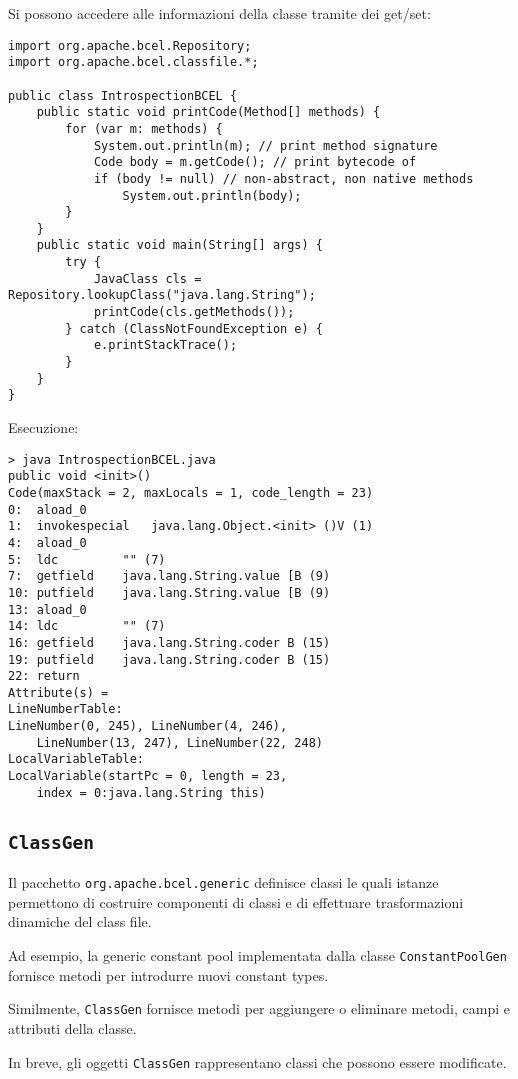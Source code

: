 Si possono accedere alle informazioni della classe tramite dei get/set:
\begin{verbatim}
import org.apache.bcel.Repository;
import org.apache.bcel.classfile.*;

public class IntrospectionBCEL {
    public static void printCode(Method[] methods) {
        for (var m: methods) {
            System.out.println(m); // print method signature
            Code body = m.getCode(); // print bytecode of
            if (body != null) // non-abstract, non native methods
                System.out.println(body);
        }
    }
    public static void main(String[] args) {
        try {
            JavaClass cls = Repository.lookupClass("java.lang.String");
            printCode(cls.getMethods());
        } catch (ClassNotFoundException e) {
            e.printStackTrace();
        }
    }
}
\end{verbatim}

Esecuzione:
\begin{verbatim}
> java IntrospectionBCEL.java
public void <init>()
Code(maxStack = 2, maxLocals = 1, code_length = 23)
0:  aload_0
1:  invokespecial   java.lang.Object.<init> ()V (1)
4:  aload_0
5:  ldc         "" (7)
7:  getfield    java.lang.String.value [B (9)
10: putfield    java.lang.String.value [B (9)
13: aload_0
14: ldc         "" (7)
16: getfield    java.lang.String.coder B (15)
19: putfield    java.lang.String.coder B (15)
22: return
Attribute(s) =
LineNumberTable:
LineNumber(0, 245), LineNumber(4, 246),
    LineNumber(13, 247), LineNumber(22, 248)
LocalVariableTable:
LocalVariable(startPc = 0, length = 23,
    index = 0:java.lang.String this)
\end{verbatim}

\subsection{\texttt{ClassGen}}

Il pacchetto \texttt{org.apache.bcel.generic} definisce classi le quali istanze permettono di costruire componenti di classi e di effettuare trasformazioni dinamiche del class file.

Ad esempio, la generic constant pool implementata dalla classe \texttt{ConstantPoolGen} fornisce metodi per introdurre nuovi constant types.

Similmente, \texttt{ClassGen} fornisce metodi per aggiungere o eliminare metodi, campi e attributi della classe.

In breve, gli oggetti \texttt{ClassGen} rappresentano classi che possono essere modificate.

